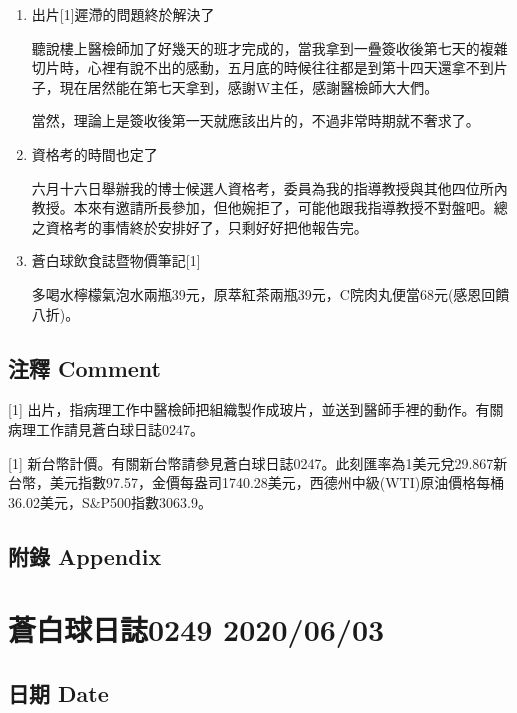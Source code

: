 \documentclass[a5paper, 11pt
]{book}
\begin{document}
\begin{enumerate}
\def\labelenumi{\arabic{enumi}.}
\item
  出片{[}1{]}遲滯的問題終於解決了

  聽說樓上醫檢師加了好幾天的班才完成的，當我拿到一疊簽收後第七天的複雜切片時，心裡有說不出的感動，五月底的時候往往都是到第十四天還拿不到片子，現在居然能在第七天拿到，感謝W主任，感謝醫檢師大大們。

  當然，理論上是簽收後第一天就應該出片的，不過非常時期就不奢求了。
\item
  資格考的時間也定了

  六月十六日舉辦我的博士候選人資格考，委員為我的指導教授與其他四位所內教授。本來有邀請所長參加，但他婉拒了，可能他跟我指導教授不對盤吧。總之資格考的事情終於安排好了，只剩好好把他報告完。
\item
  蒼白球飲食誌暨物價筆記{[}1{]}

  多喝水檸檬氣泡水兩瓶39元，原萃紅茶兩瓶39元，C院肉丸便當68元(感恩回饋八折)。
\end{enumerate}

\hypertarget{ux6ce8ux91cb-comment-1}{%
\subsection{注釋 Comment}\label{ux6ce8ux91cb-comment-1}}

{[}1{]}
出片，指病理工作中醫檢師把組織製作成玻片，並送到醫師手裡的動作。有關病理工作請見蒼白球日誌0247。

{[}1{]}
新台幣計價。有關新台幣請參見蒼白球日誌0247。此刻匯率為1美元兌29.867新台幣，美元指數97.57，金價每盎司1740.28美元，西德州中級(WTI)原油價格每桶36.02美元，S\&P500指數3063.9。

\hypertarget{ux9644ux9304-appendix-1}{%
\subsection{附錄 Appendix}\label{ux9644ux9304-appendix-1}}

\hypertarget{ux84bcux767dux7403ux65e5ux8a8c0249-20200603}{%
\section{蒼白球日誌0249
2020/06/03}\label{ux84bcux767dux7403ux65e5ux8a8c0249-20200603}}

\hypertarget{ux65e5ux671f-date-2}{%
\subsection{日期 Date}\label{ux65e5ux671f-date-2}}
\end{document}
